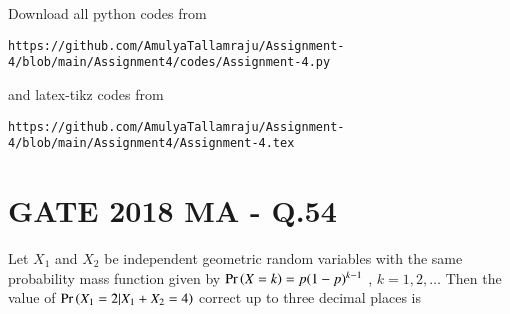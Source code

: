 \documentclass[journal,12pt,twocolumn]{IEEEtran}
\begin{document}
\maketitle
\newpage
\bigskip
\renewcommand{\thefigure}{\theenumi}
\renewcommand{\thetable}{\theenumi}
\newcommand*{\permcomb}[4][0mu]{{{}^{#3}\mkern#1#2_{#4}}}
\newcommand*{\perm}[1][-3mu]{\permcomb[#1]{P}}
\newcommand*{\comb}[1][-1mu]{\permcomb[#1]{C}}
Download all python codes from 
\begin{lstlisting}
https://github.com/AmulyaTallamraju/Assignment-4/blob/main/Assignment4/codes/Assignment-4.py
\end{lstlisting}
%
and latex-tikz codes from 
%
\begin{lstlisting}
https://github.com/AmulyaTallamraju/Assignment-4/blob/main/Assignment4/Assignment-4.tex
\end{lstlisting}
\section*{GATE 2018 MA - Q.54}
Let $X_1$ and $X_2$ be independent geometric random variables with the same probability
mass function given by $\Pr\left(X = k\right) = p(1-p)^{k-1}$
, $k = 1, 2, \ldots$ Then the value of
$\Pr\left(X_1 = 2 | X_1 + X_2 = 4\right)$ correct up to three decimal places is
\end{document}
